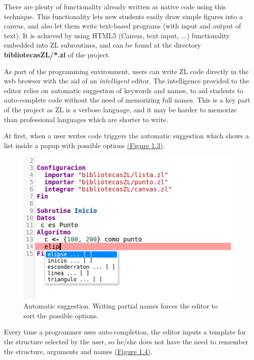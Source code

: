 \documentclass{report}
\begin{document}
	There are plenty of functionality already written as native code using this technique. This functionality lets new students easily draw simple figures into a canvas, and also let them write text-based programs (with input and output of text). It is achieved by using HTML5 (Canvas, text input, ...) functionality embedded into ZL subroutines, and can be found at the directory \textbf{bibliotecasZL/*.zl} of the project.  

	As part of the programming environment, users can write ZL code directly in the web browser with the aid of an \textit{intelligent} editor. The intelligence provided to the editor relies on automatic suggestion of keywords and names, to aid students to auto-complete code without the need of memorizing full names. This is a key part of the project as ZL is a verbose language, and it may be harder to memorize than professional languages which are shorter to write.
	
	At first, when a user writes code triggers the automatic suggestion which shows a list inside a popup with possible options \hyperref[fig:beforecompletion]{(Figure 1.3)}.
	
	
\begin{figure}
\centering
\includegraphics[width=0.7\linewidth]{beforecompletion}
\caption[Automatic suggestion]{Automatic suggestion. Writing partial names forces the editor to sort the possible options.}
\label{fig:beforecompletion}
\end{figure}

	Every time a programmer uses auto-completion, the editor inputs a template for the structure selected by the user, so he/she does not have the need to remember the structure, arguments and names \hyperref[fig:aftercompletion]{(Figure 1.4)}.
	
\end{document}
